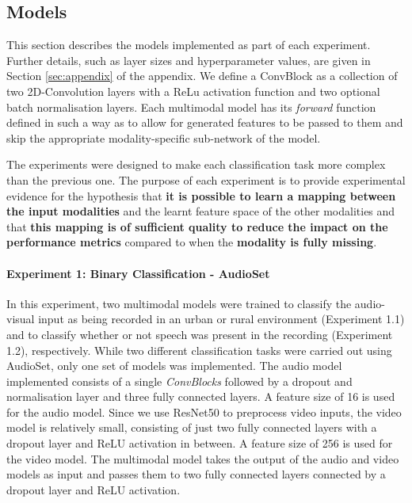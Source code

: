 \subsection{Models}
This section describes the models implemented as part of each experiment. Further details, such as layer sizes and hyperparameter values, are given in Section \ref{sec:appendix} of the appendix. We define a ConvBlock as a collection of two 2D-Convolution layers with a ReLu activation function and two optional batch normalisation layers. Each multimodal model has its \textit{forward} function defined in such a way as to allow for generated features to be passed to them and skip the appropriate modality-specific sub-network of the model.

The experiments were designed to make each classification task more complex than the previous one. The purpose of each experiment is to provide experimental evidence for the hypothesis that \textbf{it is possible to learn a mapping between the input modalities} and the learnt feature space of the other modalities and that \textbf{this mapping is of sufficient quality to reduce the impact on the performance metrics} compared to when the \textbf{modality is fully missing}.

\paragraph{\textbf{Experiment 1: Binary Classification - AudioSet}} In this experiment, two multimodal models were trained to classify the audio-visual input as being recorded in an urban or rural environment (Experiment 1.1) and to classify whether or not speech was present in the recording (Experiment 1.2), respectively. While two different classification tasks were carried out using AudioSet, only one set of models was implemented. The audio model implemented consists of a single \textit{ConvBlocks} followed by a dropout and normalisation layer and three fully connected layers. A feature size of 16 is used for the audio model. Since we use ResNet50 to preprocess video inputs, the video model is relatively small, consisting of just two fully connected layers with a dropout layer and ReLU activation in between. A feature size of 256 is used for the video model. The multimodal model takes the output of the audio and video models as input and passes them to two fully connected layers connected by a dropout layer and ReLU activation.

